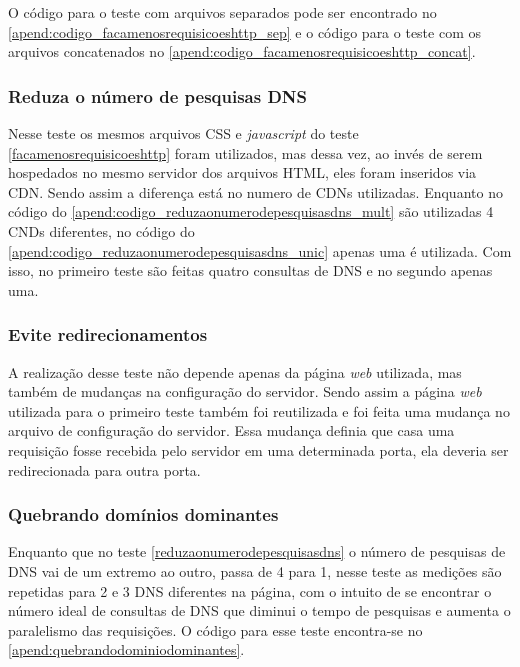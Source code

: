 O código para o teste com arquivos separados pode ser encontrado no \autoref{apend:codigo_facamenosrequisicoeshttp_sep} e o código para o teste com os arquivos concatenados no \autoref{apend:codigo_facamenosrequisicoeshttp_concat}.

\subsubsection{Reduza o número de pesquisas DNS}
\label{reduzaonumerodepesquisasdns}

Nesse teste os mesmos arquivos CSS e \textit{javascript} do teste \ref{facamenosrequisicoeshttp} foram utilizados, mas dessa vez, ao invés de serem hospedados no mesmo servidor dos arquivos HTML, eles foram inseridos via CDN. Sendo assim a diferença está no numero de CDNs utilizadas. Enquanto no código do \autoref{apend:codigo_reduzaonumerodepesquisasdns_mult} são utilizadas 4 CNDs diferentes, no código do \autoref{apend:codigo_reduzaonumerodepesquisasdns_unic} apenas uma é utilizada. Com isso, no primeiro teste são feitas quatro consultas de DNS e no segundo apenas uma.

\subsubsection{Evite redirecionamentos}
\label{eviteredirecionamentos}

A realização desse teste não depende apenas da página \textit{web} utilizada, mas também de mudanças na configuração do servidor. Sendo assim a página \textit{web} utilizada para o primeiro teste também foi reutilizada e foi feita uma mudança no arquivo de configuração do servidor. Essa mudança definia que casa uma requisição fosse recebida pelo servidor em uma determinada porta, ela deveria ser redirecionada para outra porta.

\subsubsection{Quebrando domínios dominantes}
\label{quebrandodominiosdominantes}

Enquanto que no teste \autoref{reduzaonumerodepesquisasdns} o número de pesquisas de DNS vai de um extremo ao outro, passa de 4 para 1, nesse teste as medições são repetidas para 2 e 3 DNS diferentes na página, com o intuito de se encontrar o número ideal de consultas de DNS que diminui o tempo de pesquisas e aumenta o paralelismo das requisições. O código para esse teste encontra-se no \autoref{apend:quebrandodominiodominantes}.


